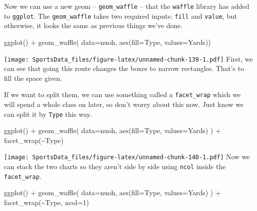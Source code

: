 \documentclass[
]{book}
\newenvironment{Shaded}{\begin{snugshade}}{\end{snugshade}}
\newcommand{\AttributeTok}[1]{\textcolor[rgb]{0.77,0.63,0.00}{#1}}
\newcommand{\DecValTok}[1]{\textcolor[rgb]{0.00,0.00,0.81}{#1}}
\newcommand{\FunctionTok}[1]{\textcolor[rgb]{0.00,0.00,0.00}{#1}}
\newcommand{\NormalTok}[1]{#1}
\newcommand{\SpecialCharTok}[1]{\textcolor[rgb]{0.00,0.00,0.00}{#1}}
\begin{document}
Now we can use a new geom -- \texttt{geom\_waffle} -- that the \texttt{waffle} library has added to \texttt{ggplot}. The \texttt{geom\_waffle} takes two required inputs: \texttt{fill} and \texttt{value}, but otherwise, it looks the same as previous things we've done.

\begin{Shaded}
\begin{Highlighting}[]
\FunctionTok{ggplot}\NormalTok{() }\SpecialCharTok{+} \FunctionTok{geom\_waffle}\NormalTok{(}
  \AttributeTok{data=}\NormalTok{nuoh,}
  \FunctionTok{aes}\NormalTok{(}\AttributeTok{fill=}\NormalTok{Type, }\AttributeTok{values=}\NormalTok{Yards))}
\end{Highlighting}
\end{Shaded}

\texttt{[image: SportsData\_files/figure-latex/unnamed-chunk-139-1.pdf]}
First, we can see that going this route changes the boxes to narrow rectangles. That's to fill the space given.

If we want to split them, we can use something called a \texttt{facet\_wrap} which we will spend a whole class on later, so don't worry about this now. Just know we can split it by \texttt{Type} this way.

\begin{Shaded}
\begin{Highlighting}[]
\FunctionTok{ggplot}\NormalTok{() }\SpecialCharTok{+} \FunctionTok{geom\_waffle}\NormalTok{(}
  \AttributeTok{data=}\NormalTok{nuoh,}
  \FunctionTok{aes}\NormalTok{(}\AttributeTok{fill=}\NormalTok{Type, }\AttributeTok{values=}\NormalTok{Yards)}
\NormalTok{) }\SpecialCharTok{+} \FunctionTok{facet\_wrap}\NormalTok{(}\SpecialCharTok{\textasciitilde{}}\NormalTok{Type)}
\end{Highlighting}
\end{Shaded}

\texttt{[image: SportsData\_files/figure-latex/unnamed-chunk-140-1.pdf]}
Now we can stack the two charts so they aren't side by side using \texttt{ncol} inside the \texttt{facet\_wrap}.

\begin{Shaded}
\begin{Highlighting}[]
\FunctionTok{ggplot}\NormalTok{() }\SpecialCharTok{+} \FunctionTok{geom\_waffle}\NormalTok{(}
  \AttributeTok{data=}\NormalTok{nuoh,}
  \FunctionTok{aes}\NormalTok{(}\AttributeTok{fill=}\NormalTok{Type, }\AttributeTok{values=}\NormalTok{Yards)}
\NormalTok{) }\SpecialCharTok{+} \FunctionTok{facet\_wrap}\NormalTok{(}\SpecialCharTok{\textasciitilde{}}\NormalTok{Type, }\AttributeTok{ncol=}\DecValTok{1}\NormalTok{)}
\end{Highlighting}
\end{Shaded}
\end{document}
